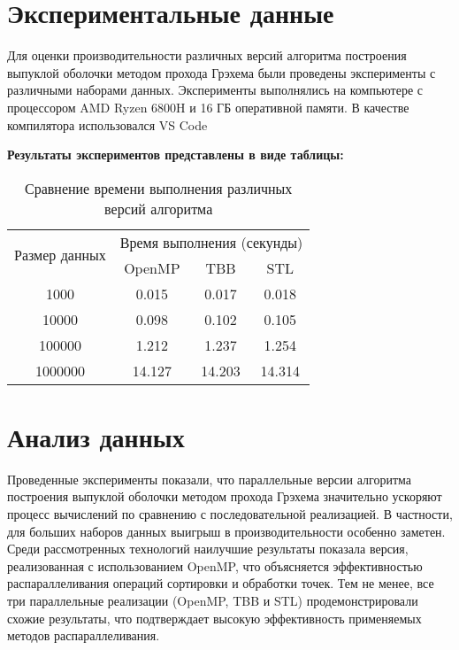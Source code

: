 \documentclass{report}
\begin{document}
\section*{Экспериментальные данные}
\par Для оценки производительности различных версий алгоритма построения выпуклой оболочки методом прохода Грэхема были проведены эксперименты с различными наборами данных. Эксперименты выполнялись на компьютере с процессором AMD Ryzen 6800H и 16 ГБ оперативной памяти. В качестве компилятора использовался VS Code
\par \textbf{Результаты экспериментов представлены в виде таблицы:}

\begin{table}[h]
\centering
\begin{tabular}{|c|c|c|c|}
\hline
\multirow{2}{*}{Размер данных} & \multicolumn{3}{c|}{Время выполнения (секунды)} \\ \cline{2-4} 
                               & OpenMP & TBB   & STL  \\ \hline
1000                           & 0.015  & 0.017 & 0.018 \\ \hline
10000                          & 0.098  & 0.102 & 0.105 \\ \hline
100000                         & 1.212  & 1.237 & 1.254 \\ \hline
1000000                        & 14.127 & 14.203& 14.314\\ \hline
\end{tabular}
\caption{Сравнение времени выполнения различных версий алгоритма}
\label{table:results}
\end{table}

\newpage

\section*{Анализ данных}
\par Проведенные эксперименты показали, что параллельные версии алгоритма построения выпуклой оболочки методом прохода Грэхема значительно ускоряют процесс вычислений по сравнению с последовательной реализацией. В частности, для больших наборов данных выигрыш в производительности особенно заметен. Среди рассмотренных технологий наилучшие результаты показала версия, реализованная с использованием OpenMP, что объясняется эффективностью распараллеливания операций сортировки и обработки точек. Тем не менее, все три параллельные реализации (OpenMP, TBB и STL) продемонстрировали схожие результаты, что подтверждает высокую эффективность применяемых методов распараллеливания.
\end{document}
